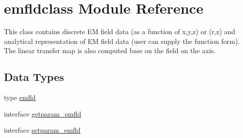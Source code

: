 \hypertarget{namespaceemfldclass}{}\section{emfldclass Module Reference}
\label{namespaceemfldclass}


This class contains discrete EM field data (as a function of x,y,z) or (r,z) and analytical representation of EM field data (user can supply the function form). The linear transfer map is also computed base on the field on the axis.  


\subsection*{Data Types}
\begin{DoxyCompactItemize}
\item 
type \mbox{\hyperlink{namespaceemfldclass_structemfldclass_1_1emfld}{emfld}}
\item 
interface \mbox{\hyperlink{interfaceemfldclass_1_1getparam__emfld}{getparam\+\_\+emfld}}
\item 
interface \mbox{\hyperlink{interfaceemfldclass_1_1setparam__emfld}{setparam\+\_\+emfld}}
\end{DoxyCompactItemize}
